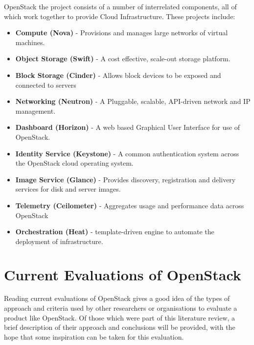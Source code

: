 OpenStack the project consists of a number of interrelated components, all of which work together to provide Cloud Infrastructure. These projects include\cite{openstacksoftware}:

\begin{itemize}

\item \textbf{Compute (Nova)} - Provisions and manages large networks of virtual machines.
\item \textbf{Object Storage (Swift)} - A cost effective, scale-out storage platform. 
\item \textbf{Block Storage (Cinder)} - Allows block devices to be exposed and connected to servers
\item\textbf{ Networking (Neutron)} - A Pluggable, scalable, API-driven network and IP management.
\item \textbf{Dashboard (Horizon)} - A web based Graphical User Interface for use of OpenStack.
\item \textbf{Identity Service (Keystone)} - A common authentication system across the OpenStack cloud operating system. 
\item\textbf{ Image Service (Glance)} -  Provides discovery, registration and delivery services for disk and server images. 
\item \textbf{Telemetry (Ceilometer)} -  Aggregates usage and performance data across OpenStack
\item \textbf{Orchestration (Heat)} - template-driven engine to automate the deployment of infrastructure.
\end{itemize}

\section{Current Evaluations of OpenStack}
Reading current evaluations of OpenStack gives a good idea of the types of approach and criteria used by other researchers or organisations to evaluate a product like OpenStack. Of those which were part of this literature review, a brief description of their approach and conclusions will be provided, with the hope that some inspiration can be taken for this evaluation. 


